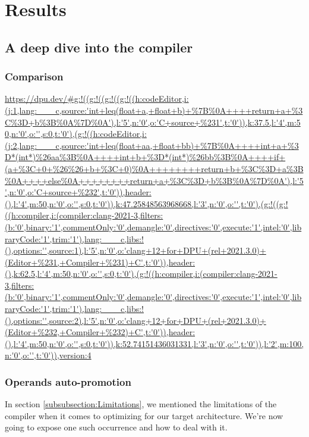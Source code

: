 \chapter{Results}

\section{A deep dive into the compiler}

\subsection{Comparison}
\url{https://dpu.dev/#g:!((g:!((g:!((g:!((h:codeEditor,i:(j:1,lang:___c,source:'int+leq(float+a,+float+b)+%7B%0A++++return+a+%3C%3D+b%3B%0A%7D%0A'),l:'5',n:'0',o:'C+source+%231',t:'0')),k:37.5,l:'4',m:50,n:'0',o:'',s:0,t:'0'),(g:!((h:codeEditor,i:(j:2,lang:___c,source:'int+leq(float+aa,+float+bb)+%7B%0A++++int+a+%3D*(int*)%26aa%3B%0A++++int+b+%3D*(int*)%26bb%3B%0A++++if+(a+%3C+0+%26%26+b+%3C+0)%0A++++++++return+b+%3C%3D+a%3B%0A++++else%0A++++++++return+a+%3C%3D+b%3B%0A%7D%0A'),l:'5',n:'0',o:'C+source+%232',t:'0')),header:(),l:'4',m:50,n:'0',o:'',s:0,t:'0')),k:47.25848563968668,l:'3',n:'0',o:'',t:'0'),(g:!((g:!((h:compiler,i:(compiler:clang-2021-3,filters:(b:'0',binary:'1',commentOnly:'0',demangle:'0',directives:'0',execute:'1',intel:'0',libraryCode:'1',trim:'1'),lang:___c,libs:!(),options:'',source:1),l:'5',n:'0',o:'clang+12+for+DPU+(rel+2021.3.0)+(Editor+%231,+Compiler+%231)+C',t:'0')),header:(),k:62.5,l:'4',m:50,n:'0',o:'',s:0,t:'0'),(g:!((h:compiler,i:(compiler:clang-2021-3,filters:(b:'0',binary:'1',commentOnly:'0',demangle:'0',directives:'0',execute:'1',intel:'0',libraryCode:'1',trim:'1'),lang:___c,libs:!(),options:'',source:2),l:'5',n:'0',o:'clang+12+for+DPU+(rel+2021.3.0)+(Editor+%232,+Compiler+%232)+C',t:'0')),header:(),l:'4',m:50,n:'0',o:'',s:0,t:'0')),k:52.74151436031331,l:'3',n:'0',o:'',t:'0')),l:'2',m:100,n:'0',o:'',t:'0')),version:4}

\subsection{Operands auto-promotion}

In section \ref{subsubsection:Limitations}, we mentioned the limitations of the compiler when it comes to optimizing for our target architecture. We're now going to expose one such occurrence and how to deal with it.

